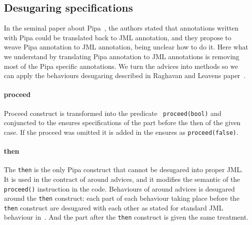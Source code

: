 \subsection{Desugaring specifications}
\label{desugar}
In the seminal paper about Pipa~\cite{ZhaoR03}, the authors stated
that annotations written with Pipa could be translated back to JML
annotation, and they propose to weave Pipa annotation to JML
annotation, being unclear how to do it.  Here what we understand by
translating Pipa annotation to JML annotations is removing most of the
Pipa specific annotations. We turn the advices into methods so 
we can apply the behaviours desugaring described in Raghavan and Leavens
paper~\cite{RaghavanL00}.

\paragraph{proceed}
Proceed construct is transformed into the predicate {\tt
proceed(bool)} and conjuncted to the ensures specifications of the
part before the then of the given case.  If the proceed was omitted it
is added in the ensures as {\tt proceed(false)}.


\paragraph{then}
The {\tt then} is the only Pipa construct that cannot be desugared
into proper JML. It is used in the contract of around advices, and it
modifies the semantic of the {\tt proceed()} instruction in the code.
Behaviours of around advices is desugared around the {\tt then}
construct: each part of each behaviour taking place before the {\tt
then} construct are desugared with each other as stated for standard
JML behaviour in~\cite{clifton02spectators}.  And the part after the
{\tt then} construct is given the same treatment.

